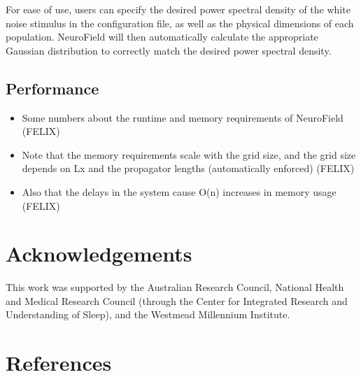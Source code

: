 \documentclass[preprint,review,10pt,authoryear,letterpaper]{elsarticle}
\begin{document}
For ease of use, users can specify the desired power spectral density of the white noise stimulus in the configuration file, as well as the physical dimensions of each population. NeuroField will then automatically calculate the appropriate Gaussian distribution to correctly match the desired power spectral density. 


\subsection{Performance}

\begin{itemize}
\item Some numbers about the runtime and memory requirements of NeuroField (FELIX)
\item Note that the memory requirements scale with the grid size, and the grid size depends on Lx and the propagator lengths (automatically enforced) (FELIX)
\item Also that the delays in the system cause O(n) increases in memory usage (FELIX)
\end{itemize}


\section{Acknowledgements}
\label{sec:acknowledgements}
This work was supported by the Australian Research Council, National Health and Medical Research Council (through the Center for Integrated Research and Understanding of Sleep), and the Westmead Millennium Institute.

\section{References}


\end{document}

